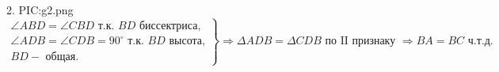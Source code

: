2.  {{PIC:g2.png}}\\
$\left.\begin{array}{l}\angle ABD=\angle CBD\text{ т.к. }BD\text{ биссектриса,}\\
\angle ADB=\angle CDB=90^\circ \text{ т.к. }BD\text{ высота,}\\
BD - \text{ общая.}   \end{array}\right\}\Rightarrow
\Delta ADB=\Delta CDB\text{ по II признаку }\Rightarrow BA=BC\text{ ч.т.д.} $\\
